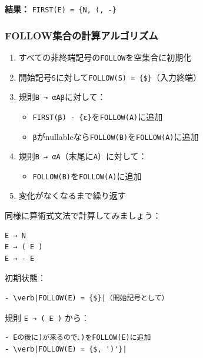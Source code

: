 \textbf{結果：}
\texttt{FIRST(E)\ =\ \{N,\ \textquotesingle{}(\textquotesingle{},\ \textquotesingle{}-\textquotesingle{}\}}

\hypertarget{chapter5-followux96c6ux5408ux306eux8a08ux7b97ux30a2ux30ebux30b4ux30eaux30baux30e0}{%
\subsubsection{FOLLOW集合の計算アルゴリズム}\label{chapter5-followux96c6ux5408ux306eux8a08ux7b97ux30a2ux30ebux30b4ux30eaux30baux30e0}}

\begin{enumerate}
\def\labelenumi{\arabic{enumi}.}
\tightlist
\item
  すべての非終端記号の\texttt{FOLLOW}を空集合に初期化
\item
  開始記号\texttt{S}に対して\texttt{FOLLOW(S)\ =\ \{\$\}}（入力終端）
\item
  規則\texttt{B\ →\ αAβ}に対して：

  \begin{itemize}
  \tightlist
  \item
    \texttt{FIRST(β)\ -\ \{ε\}}を\texttt{FOLLOW(A)}に追加
  \item
    \texttt{β}がnullableなら\texttt{FOLLOW(B)}を\texttt{FOLLOW(A)}に追加
  \end{itemize}
\item
  規則\texttt{B\ →\ αA}（末尾に\texttt{A}）に対して：

  \begin{itemize}
  \tightlist
  \item
    \texttt{FOLLOW(B)}を\texttt{FOLLOW(A)}に追加
  \end{itemize}
\item
  変化がなくなるまで繰り返す
\end{enumerate}

同様に算術式文法で計算してみましょう：

\begin{verbatim}
E → N
E → ( E )
E → - E
\end{verbatim}

初期状態：

\begin{verbatim}
- \verb|FOLLOW(E) = {$}|（開始記号として）
\end{verbatim}

規則 \texttt{E\ →\ (\ E\ )} から：

\begin{verbatim}
- Eの後に)が来るので、)をFOLLOW(E)に追加
- \verb|FOLLOW(E) = {$, ')'}|
\end{verbatim}

